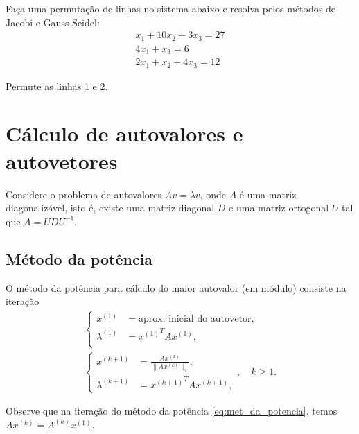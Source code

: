 \begin{exer} Faça uma permutação de linhas no sistema abaixo e resolva pelos métodos de Jacobi e Gauss-Seidel:
\begin{eqnarray}
x_1+10x_2+3x_3=27\\
4x_1+x_3=6\\
2x_1+x_2+4x_3=12
\end{eqnarray}
\end{exer}
\begin{resp}

    Permute as linhas 1 e 2.

\end{resp}


\section{Cálculo de autovalores e autovetores}

Considere o problema de autovalores $Av=\lambda v$, onde $A$ é uma matriz diagonalizável, isto é, existe uma matriz diagonal $D$ e uma matriz ortogonal $U$ tal que $A=UDU^{-1}$.

\subsection{Método da potência}

O método da potência para cálculo do maior autovalor (em módulo) consiste na iteração
\begin{equation}\label{eq:met_da_potencia}
\begin{array}{l}
  \left\{\begin{array}{ll}
    \displaystyle x^{(1)} &=\text{aprox. inicial do autovetor},\\
    \displaystyle \lambda^{(1)} &= {x^{(1)}}^T A x^{(1)},\\
  \end{array}\right.\\
  \left\{
  \begin{array}{ll}
    \displaystyle x^{(k+1)} &= \frac{Ax^{(k)}}{\|Ax^{(k)}\|_2},\\
    \displaystyle \lambda^{(k+1)} &= {x^{(k+1)}}^T A x^{(k+1)},
  \end{array}\right.,\quad k\geq 1.
  \end{array}
\end{equation}

\begin{obs}
  Observe que na iteração do método da potência \eqref{eq:met_da_potencia}, temos $Ax^{(k)} = A^{(k)}x^{(1)}$.
\end{obs}

